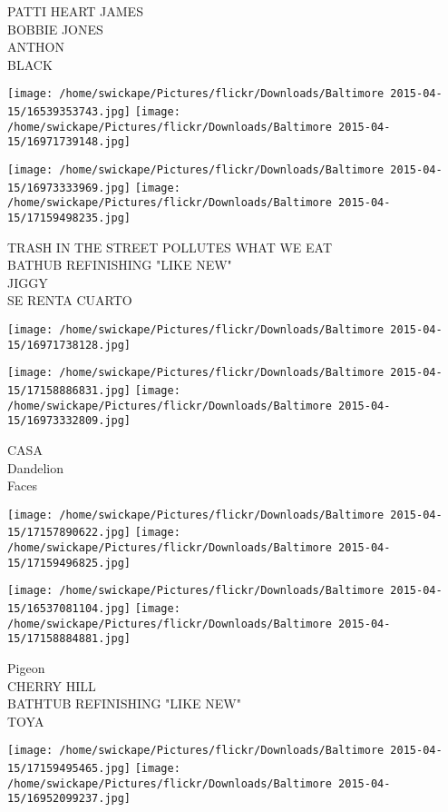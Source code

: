 \documentclass[10pt,letterpaper]{article}
\begin{document}
PATTI HEART JAMES\\
BOBBIE JONES\\
ANTHON\\
BLACK
\pagebreak

\texttt{[image: /home/swickape/Pictures/flickr/Downloads/Baltimore 2015-04-15/16539353743.jpg]}
\texttt{[image: /home/swickape/Pictures/flickr/Downloads/Baltimore 2015-04-15/16971739148.jpg]}

\texttt{[image: /home/swickape/Pictures/flickr/Downloads/Baltimore 2015-04-15/16973333969.jpg]}
\texttt{[image: /home/swickape/Pictures/flickr/Downloads/Baltimore 2015-04-15/17159498235.jpg]}

TRASH IN THE STREET POLLUTES WHAT WE EAT\\
BATHUB REFINISHING "LIKE NEW"\\
JIGGY\\
SE RENTA CUARTO
\pagebreak

\texttt{[image: /home/swickape/Pictures/flickr/Downloads/Baltimore 2015-04-15/16971738128.jpg]}

\vspace{0.25in}
\texttt{[image: /home/swickape/Pictures/flickr/Downloads/Baltimore 2015-04-15/17158886831.jpg]}
\texttt{[image: /home/swickape/Pictures/flickr/Downloads/Baltimore 2015-04-15/16973332809.jpg]}

CASA\\
Dandelion\\
Faces
\pagebreak

\texttt{[image: /home/swickape/Pictures/flickr/Downloads/Baltimore 2015-04-15/17157890622.jpg]}
\texttt{[image: /home/swickape/Pictures/flickr/Downloads/Baltimore 2015-04-15/17159496825.jpg]}

\texttt{[image: /home/swickape/Pictures/flickr/Downloads/Baltimore 2015-04-15/16537081104.jpg]}
\texttt{[image: /home/swickape/Pictures/flickr/Downloads/Baltimore 2015-04-15/17158884881.jpg]}

Pigeon\\
CHERRY HILL\\
BATHTUB REFINISHING "LIKE NEW"\\
TOYA
\pagebreak

\texttt{[image: /home/swickape/Pictures/flickr/Downloads/Baltimore 2015-04-15/17159495465.jpg]}
\texttt{[image: /home/swickape/Pictures/flickr/Downloads/Baltimore 2015-04-15/16952099237.jpg]}
\end{document}
